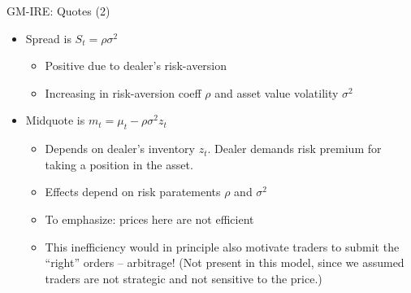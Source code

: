 \documentclass[english,10pt
,aspectratio=169
]{beamer}
\begin{document}
\begin{frame}{GM-IRE: Quotes (2)}
	\begin{itemize}
		\item \alert{Spread} is $S_t = \rho \sigma^2 $
		\begin{itemize}
			\item Positive due to dealer's risk-aversion
			\item Increasing in risk-aversion coeff $\rho$ and asset value volatility $\sigma^2$
		\end{itemize}
		\pause
		\item \alert{Midquote} is $m_t = \mu_t - \rho \sigma^2 z_t$
		\begin{itemize}
			\item Depends on dealer's inventory $z_t$. Dealer demands risk premium for taking a position in the asset.
			\item Effects depend on risk paratements $\rho$ and $\sigma^2$
			\item To emphasize: prices here are \alert{not efficient}
			\item This inefficiency would in principle also motivate traders to submit the ``right'' orders -- arbitrage! (Not present in this model, since we assumed traders are not strategic and not sensitive to the price.)
		\end{itemize}
	\end{itemize}
\end{frame}
\end{document}
